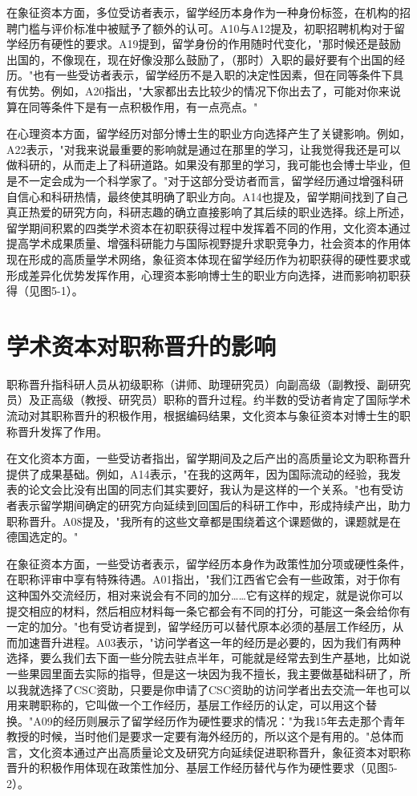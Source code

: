 在象征资本方面，多位受访者表示，留学经历本身作为一种身份标签，在机构的招聘门槛与评价标准中被赋予了额外的认可。A10与A12提及，初职招聘机构对于留学经历有硬性的要求。A19提到，留学身份的作用随时代变化，"那时候还是鼓励出国的，不像现在，现在好像没那么鼓励了，（那时）入职的最好要有个出国的经历。"也有一些受访者表示，留学经历不是入职的决定性因素，但在同等条件下具有优势。例如，A20指出，"大家都出去比较少的情况下你出去了，可能对你来说算在同等条件下是有一点积极作用，有一点亮点。"

在心理资本方面，留学经历对部分博士生的职业方向选择产生了关键影响。例如，A22表示，"对我来说最重要的影响就是通过在那里的学习，让我觉得我还是可以做科研的，从而走上了科研道路。如果没有那里的学习，我可能也会博士毕业，但是不一定会成为一个科学家了。"对于这部分受访者而言，留学经历通过增强科研自信心和科研热情，最终使其明确了职业方向。A14也提及，留学期间找到了自己真正热爱的研究方向，科研志趣的确立直接影响了其后续的职业选择。综上所述，留学期间积累的四类学术资本在初职获得过程中发挥着不同的作用，文化资本通过提高学术成果质量、增强科研能力与国际视野提升求职竞争力，社会资本的作用体现在形成的高质量学术网络，象征资本体现在留学经历作为初职获得的硬性要求或形成差异化优势发挥作用，心理资本影响博士生的职业方向选择，进而影响初职获得（见图5-1）。


\section{学术资本对职称晋升的影响}

职称晋升指科研人员从初级职称（讲师、助理研究员）向副高级（副教授、副研究员）及正高级（教授、研究员）职称的晋升过程。约半数的受访者肯定了国际学术流动对其职称晋升的积极作用，根据编码结果，文化资本与象征资本对博士生的职称晋升发挥了作用。

在文化资本方面，一些受访者指出，留学期间及之后产出的高质量论文为职称晋升提供了成果基础。例如，A14表示，"在我的这两年，因为国际流动的经验，我发表的论文会比没有出国的同志们其实要好，我认为是这样的一个关系。"也有受访者表示留学期间确定的研究方向延续到回国后的科研工作中，形成持续产出，助力职称晋升。A08提及，"我所有的这些文章都是围绕着这个课题做的，课题就是在德国选定的。"

在象征资本方面，一些受访者表示，留学经历本身作为政策性加分项或硬性条件，在职称评审中享有特殊待遇。A01指出，"我们江西省它会有一些政策，对于你有这种国外交流经历，相对来说会有不同的加分……它有这样的规定，就是说你可以提交相应的材料，然后相应材料每一条它都会有不同的打分，可能这一条会给你有一定的加分。"也有受访者提到，留学经历可以替代原本必须的基层工作经历，从而加速晋升进程。A03表示，"访问学者这一年的经历是必要的，因为我们有两种选择，要么我们去下面一些分院去驻点半年，可能就是经常去到生产基地，比如说一些果园里面去实际的指导，但是这一块因为我不擅长，我主要做基础科研了，所以我就选择了CSC资助，只要是你申请了CSC资助的访问学者出去交流一年也可以用来聘职称的，它叫做一个工作经历，基层工作经历的认定，可以用这个替换。"A09的经历则展示了留学经历作为硬性要求的情况："为我15年去走那个青年教授的时候，当时他们是要求一定要有海外经历的，所以这个是有用的。"总体而言，文化资本通过产出高质量论文及研究方向延续促进职称晋升，象征资本对职称晋升的积极作用体现在政策性加分、基层工作经历替代与作为硬性要求（见图5-2）。

